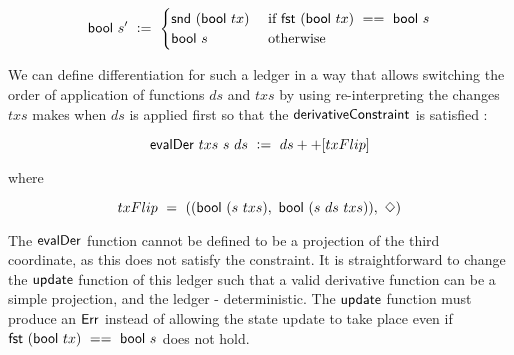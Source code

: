 \begin{itemize}
  \[ \mathsf{bool}~s' ~\mathrel{\mathop:}=~ \begin{cases}
     \mathsf{snd}~(\mathsf{bool}~tx) & \text{ if } \mathsf{fst}~(\mathsf{bool}~tx)~==~\mathsf{bool}~s \\
     \mathsf{bool}~s & \text{ otherwise}
  \end{cases} \]

  We can define differentiation for such a ledger in a way that allows switching the order of application
  of functions $ds$ and $txs$ by using re-interpreting the changes $txs$ makes when $ds$ is applied
  first so that the $\mathsf{derivativeConstraint}$ is satisfied :

    \[\mathsf{evalDer} ~txs ~s~ ds ~\mathrel{\mathop:}=~ ds++ [txFlip] \]

    where

    \[ txFlip~=~((\mathsf{bool}~(s~txs),~\mathsf{bool}~(s~ds~txs)),~\Diamond) \]

    The $\mathsf{evalDer}$ function cannot be defined to be a projection of the third
    coordinate, as this does not satisfy the constraint. It is straightforward to change the $\mathsf{update}$
    function of this ledger
    such that a valid derivative function can be a simple projection, and the ledger - deterministic. The $\mathsf{update}$ function must
    produce an $\mathsf{Err}$ instead of
    allowing the state update to take place even if $\mathsf{fst}~(\mathsf{bool}~tx)~==~\mathsf{bool}~s$ does not hold.


\end{itemize}
